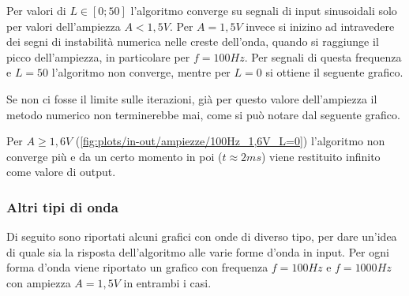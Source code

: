 				Per valori di $L \in [0;50]$ l'algoritmo converge su segnali di input sinusoidali solo per valori dell'ampiezza $A < 1,5V$. Per $A = 1,5V$ invece si inizino ad intravedere dei segni di instabilità numerica nelle creste dell'onda, quando si raggiunge il picco dell'ampiezza, in particolare per $f = 100Hz$. Per segnali di questa frequenza e $L = 50$ l'algoritmo non converge, mentre per $L = 0$ si ottiene il seguente grafico.
				\pagebreak
				
				Se non ci fosse il limite sulle iterazioni, già per questo valore dell'ampiezza il metodo numerico non terminerebbe mai, come si può notare dal seguente grafico.
				
				Per $A \ge 1,6V$ (\ref{fig:plots/in-out/ampiezze/100Hz_1,6V_L=0}) l'algoritmo non converge più e da un certo momento in poi ($t \approx 2ms$) viene restituito infinito come valore di output.
				\pagebreak
				
				
			
			\subsubsection{Altri tipi di onda}
				Di seguito sono riportati alcuni grafici con onde di diverso tipo, per dare un'idea di quale sia la risposta dell'algoritmo alle varie forme d'onda in input. Per ogni forma d'onda viene riportato un grafico con frequenza $f = 100Hz$ e  $f = 1000Hz$ con ampiezza $A = 1,5V$ in entrambi i casi.
				
